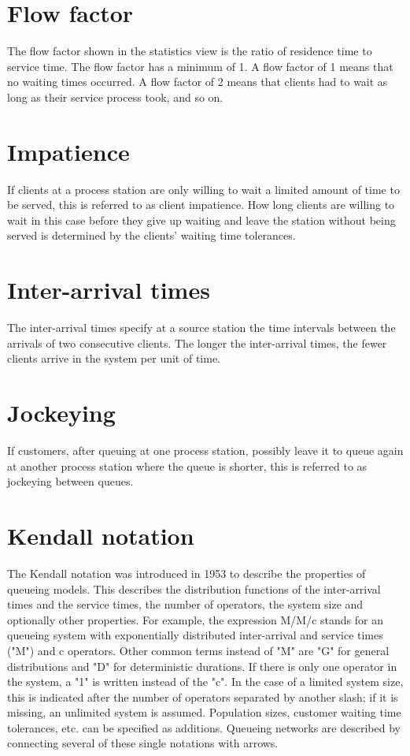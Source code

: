 \section*{Flow factor}


The flow factor shown in the statistics view is the ratio of residence time to service time.
The flow factor has a minimum of 1. A flow factor of 1 means that no waiting times occurred. A flow factor of 2 means that
clients had to wait as long as their service process took, and so on.

\section*{Impatience}


If clients at a process station are only willing to wait
a limited amount of time to be served, this is referred to as client impatience.
How long clients are willing to wait in this case before they give up waiting and leave the
station without being served is determined by the clients' waiting time tolerances.

\section*{Inter-arrival times}


The inter-arrival times specify at a source station the time intervals between
the arrivals of two consecutive clients. The longer the inter-arrival times, the fewer clients arrive in the system per unit of time.

\section*{Jockeying}


If customers, after queuing at one process station, possibly leave it to queue again at another
process station where the queue is shorter, this is referred to as jockeying between queues.

\section*{Kendall notation}


The Kendall notation was introduced in 1953 to describe the properties of queueing models.
This describes the distribution functions of the inter-arrival times and the service times,
the number of operators, the system size and optionally other properties. For example,
the expression M/M/c stands for an queueing system with exponentially distributed inter-arrival
and service times ("M") and c operators. Other common terms instead of "M" are "G" for
general distributions and "D" for deterministic durations. If there is only one operator in the system,
a "1" is written instead of the "c". In the case of a limited system size, this is indicated after
the number of operators separated by another slash; if it is missing, an unlimited system is assumed.
Population sizes, customer waiting time tolerances, etc. can be specified as additions.
Queueing networks are described by connecting several of these single notations with arrows.

